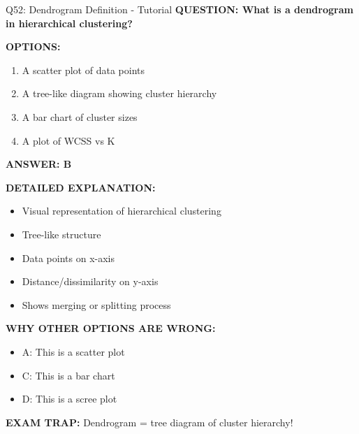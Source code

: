 \documentclass[8pt]{beamer}
\begin{document}
	\begin{frame}{Q52: Dendrogram Definition - Tutorial}
		\fontsize{6.5}{7.5}\selectfont
		\textbf{QUESTION: What is a dendrogram in hierarchical clustering?}
		
		\vspace{0.1cm}
		\textbf{OPTIONS:}
		\begin{enumerate}
			\item A scatter plot of data points
			\item A tree-like diagram showing cluster hierarchy
			\item A bar chart of cluster sizes
			\item A plot of WCSS vs K
		\end{enumerate}
		
		\vspace{0.1cm}
		\textcolor{myblue}{\textbf{ANSWER: B}}
		
		\vspace{0.1cm}
		\textbf{DETAILED EXPLANATION:}
		\begin{itemize}
			\item Visual representation of hierarchical clustering
			\item Tree-like structure
			\item Data points on x-axis
			\item Distance/dissimilarity on y-axis
			\item Shows merging or splitting process
		\end{itemize}
		
		\vspace{0.1cm}
		\textcolor{myred}{\textbf{WHY OTHER OPTIONS ARE WRONG:}}
		\begin{itemize}
			\item \textcolor{myred}{A:} This is a scatter plot
			\item \textcolor{myred}{C:} This is a bar chart
			\item \textcolor{myred}{D:} This is a scree plot
		\end{itemize}
		
		\textcolor{myred}{\textbf{EXAM TRAP:}} Dendrogram = \textcolor{myblue}{tree diagram of cluster hierarchy}!
	\end{frame}
	
\end{document}
